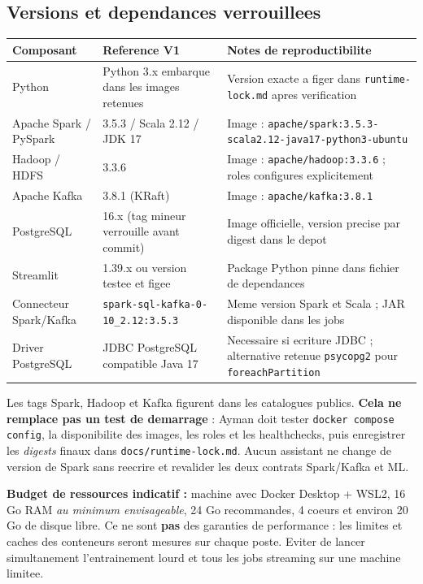 \documentclass[10pt,a4paper]{article}
\newcommand{\code}[1]{{\small\ttfamily\nolinkurl{#1}}}
\begin{document}
\subsection{Versions et dependances verrouillees}
\begin{tabularx}{\linewidth}{@{}p{39mm}p{46mm}Y@{}}
\toprule
\textbf{Composant} & \textbf{Reference V1} & \textbf{Notes de reproductibilite}\\\midrule
Python & Python 3.x embarque dans les images retenues & Version exacte a figer dans \code{runtime-lock.md} apres verification\\
Apache Spark / PySpark & 3.5.3 / Scala 2.12 / JDK 17 & Image : \code{apache/spark:3.5.3-scala2.12-java17-python3-ubuntu}\\
Hadoop / HDFS & 3.3.6 & Image : \code{apache/hadoop:3.3.6} ; roles configures explicitement\\
Apache Kafka & 3.8.1 (KRaft) & Image : \code{apache/kafka:3.8.1}\\
PostgreSQL & 16.x (tag mineur verrouille avant commit) & Image officielle, version precise par digest dans le depot\\
Streamlit & 1.39.x ou version testee et figee & Package Python pinne dans fichier de dependances\\
Connecteur Spark/Kafka & \code{spark-sql-kafka-0-10_2.12:3.5.3} & Meme version Spark et Scala ; JAR disponible dans les jobs\\
Driver PostgreSQL & JDBC PostgreSQL compatible Java 17 & Necessaire si ecriture JDBC ; alternative retenue \code{psycopg2} pour \code{foreachPartition}\\
\bottomrule
\end{tabularx}
Les tags Spark, Hadoop et Kafka figurent dans les catalogues publics. \textbf{Cela ne remplace pas un test de demarrage} : Ayman doit tester \code{docker compose config}, la disponibilite des images, les roles et les healthchecks, puis enregistrer les \emph{digests} finaux dans \code{docs/runtime-lock.md}. Aucun assistant ne change de version de Spark sans reecrire et revalider les deux contrats Spark/Kafka et ML.

\begin{warningbox}
\textbf{Budget de ressources indicatif :} machine avec Docker Desktop + WSL2, 16 Go RAM \emph{au minimum envisageable}, 24 Go recommandes, 4 coeurs et environ 20 Go de disque libre. Ce ne sont \textbf{pas} des garanties de performance : les limites et caches des conteneurs seront mesures sur chaque poste. Eviter de lancer simultanement l'entrainement lourd et tous les jobs streaming sur une machine limitee.
\end{warningbox}
\end{document}
